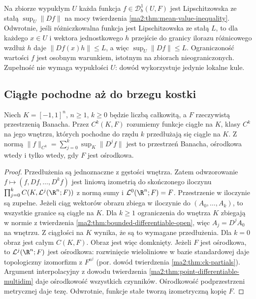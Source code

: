 Na zbiorze wypukłym $U$ każda funkcja
$f\in\mathcal D_b^1(U,F)$ jest Lipschitzowska
ze stałą $\sup_U\|Df\|$ na mocy twierdzenia
\ref{ma2:thm:mean-value-inequality}.
Odwrotnie, jeśli różniczkowalna funkcja jest
Lipschitzowska ze stałą $L$, to dla każdego
$x\in U$ i wektora jednostkowego $h$ przejście
do granicy ilorazu różnicowego wzdłuż $h$
daje $\|Df(x)h\|\le L$, a więc
$\sup_U\|Df\|\le L$. Ograniczoność wartości $f$
jest osobnym warunkiem, istotnym na zbiorach
nieograniczonych. Zupełność nie wymaga wypukłości
$U$: dowód wykorzystuje jedynie lokalne kule.

\subsection{Ciągłe pochodne aż do brzegu kostki}

\begin{twierdzenie}
\label{ma2:thm:ck-cube-banach-separable}
Niech $K=[-1,1]^n$, $n\ge1$, $k\ge0$ będzie
liczbą całkowitą, a $F$ rzeczywistą przestrzenią
Banacha. Przez $C^k(K,F)$
rozumiemy funkcje ciągłe na $K$, klasy $C^k$
na jego wnętrzu, których pochodne do rzędu $k$
przedłużają się ciągle na $K$. Z normą
$\|f\|_{C^k}=\sum_{j=0}^k\sup_K\|D^jf\|$
jest to przestrzeń Banacha, ośrodkowa wtedy
i tylko wtedy, gdy $F$ jest ośrodkowa.
\end{twierdzenie}
\begin{proof}
Przedłużenia są jednoznaczne z gęstości wnętrza.
Zatem odwzorowanie
$f\mapsto(f,Df,\ldots,D^kf)$ jest liniową
izometrią do skończonego iloczynu
$\prod_{j=0}^k C(K,\mathcal L^j(\R^n;F))$
z normą sumy i $\mathcal L^0(\R^n;F)=F$.
Przestrzenie w iloczynie są zupełne.
Jeżeli ciąg wektorów obrazu zbiega w iloczynie
do $(A_0,\ldots,A_k)$, to wszystkie granice
są ciągłe na $K$. Dla $k\ge1$ ograniczenia do
wnętrza $K$ zbiegają w normie z twierdzenia
\ref{ma2:thm:bounded-differentiable-open},
więc $A_j=D^jA_0$ na wnętrzu.
Z ciągłości na $K$ wynika, że są to
wymagane przedłużenia. Dla $k=0$ obraz jest
całym $C(K,F)$. Obraz jest więc domknięty.
Jeżeli $F$ jest ośrodkowa, to
$\mathcal L^j(\R^n;F)$ jest ośrodkowa:
rozwinięcie wieloliniowe w bazie standardowej
daje topologiczny izomorfizm z $F^{n^j}$
(por. dowód twierdzenia \ref{ma2:thm:ck-partials}).
Argument interpolacyjny z dowodu twierdzenia
\ref{ma2:thm:point-differentiable-multidim}
daje ośrodkowość wszystkich czynników.
Ośrodkowość podprzestrzeni metrycznej daje
tezę. Odwrotnie, funkcje stałe tworzą
izometryczną kopię $F$.
\end{proof}


